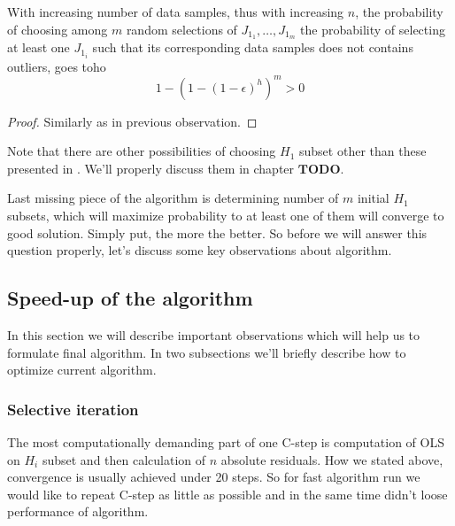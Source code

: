 \begin{observation}
	\label{cStepM}
	With increasing number of data samples, thus with increasing $n$, the probability of choosing among $m$ random selections of $J_{1_1}, \ldots ,J_{1_m}$ the probability of selecting
	at least one $J_{1_i}$ such that its corresponding data samples does not contains outliers, goes toho
	$$ 1-(1-(1-\epsilon)^h)^m  > 0$$
\end{observation}

\begin{proof}
	Similarly as in previous observation.
\end{proof}

\begin{itshape}
Note that there are other possibilities of choosing $H_1$ subset other than these presented in \cite{rouss:2000}.
We'll properly discuss them in chapter $\boldsymbol{TODO}$.\\
\end{itshape}

Last missing piece of the algorithm is determining number of $m$ initial $H_1$ subsets, which will maximize probability to at least one of them will converge to good solution. Simply put, the more the better. So before we will answer this question properly, let's discuss some key observations about algorithm.


\subsection{Speed-up of the algorithm}
In this section we will describe important observations which will help us to formulate final algorithm. In two subsections we'll briefly describe how to optimize current algorithm. 

\subsubsection{Selective iteration}
The most computationally demanding part of one C-step is computation of OLS on $H_i$ subset and then 
calculation of $n$ absolute residuals. How we stated above, convergence is usually achieved under 20 steps. 
So for fast algorithm run we would like to repeat C-step as little as possible and in the same time didn't loose performance of algorithm. 

